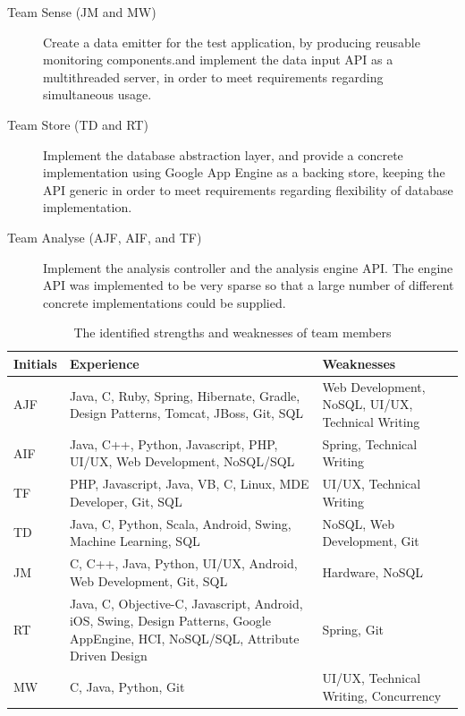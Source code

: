 \begin{description}
  \item[Team Sense  (JM and MW)] Create a data emitter for the test application, by producing reusable monitoring components.and implement the data input API as a multithreaded server, in order to meet requirements  regarding simultaneous usage.
    
  \item[Team Store  (TD and RT)] Implement the database abstraction layer, and provide a concrete implementation using Google App Engine as a backing store, keeping the API generic in order to meet requirements regarding flexibility of database implementation.

  \item[Team Analyse (AJF, AIF, and TF)] Implement the analysis controller and the analysis engine API. The engine API was implemented to be very sparse so that a large number of different concrete implementations could be supplied. 
\end{description}

\begin{table}[H]
\centering
\begin{tabular}{|p{1.2cm}|p{8cm}|p{5cm}|}
  \hline \rowcolor{titleColor}\textbf{Initials} &
  \textbf{Experience} &
  \textbf{Weaknesses}\\

  \hline AJF
  & Java, C, Ruby, Spring, Hibernate, Gradle, Design Patterns, Tomcat, JBoss,
  Git, SQL
  & Web Development, NoSQL, UI/UX, Technical Writing \\

  \hline AIF
  & Java, C++, Python, Javascript, PHP, UI/UX, Web Development, NoSQL/SQL
  & Spring, Technical Writing \\
  
  \hline TF
  & PHP, Javascript, Java, VB, C, Linux, MDE Developer, Git, SQL
  & UI/UX, Technical Writing \\

  \hline TD
  & Java, C, Python, Scala, Android, Swing, Machine Learning, SQL
  & NoSQL, Web Development, Git \\

  \hline JM
  & C, C++, Java, Python, UI/UX, Android, Web Development, Git, SQL
  & Hardware, NoSQL \\

  \hline RT
  & Java, C, Objective-C, Javascript, Android, iOS, Swing, Design Patterns,
  Google AppEngine, HCI, NoSQL/SQL, Attribute Driven Design
  & Spring, Git \\

  \hline MW
  & C, Java, Python, Git
  & UI/UX, Technical Writing, Concurrency \\
  \hline
\end{tabular}
\caption{The identified strengths and weaknesses of team members}
\label{tab:skills}
\end{table}

